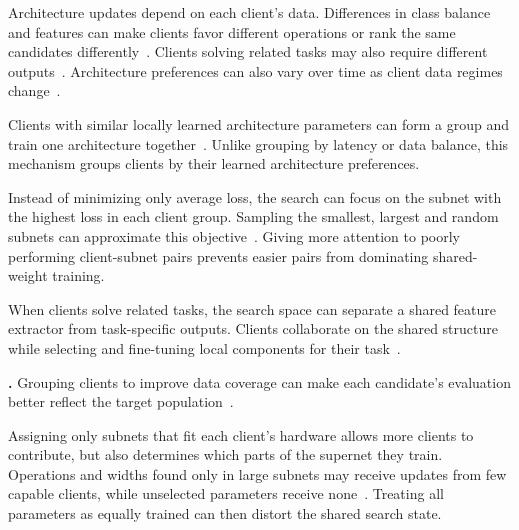 
Architecture updates depend on each client's data. Differences in class balance and features can make clients favor different operations or rank the same candidates differently~\cite{collaborative_nas_for_pfl_2025,superfednas_2024}. Clients solving related tasks may also require different outputs~\cite{fedpnas_2021}. Architecture preferences can also vary over time as client data regimes change~\cite{fedregnas_2025}.

 Clients with similar locally learned architecture parameters can form a group and train one architecture together~\cite{electricity_load_forecasting_fl_darts_2023}. Unlike grouping by latency or data balance, this mechanism groups clients by their learned architecture preferences.

 Instead of minimizing only average loss, the search can focus on the subnet with the highest loss in each client group. Sampling the smallest, largest and random subnets can approximate this objective~\cite{superfednas_2024}. Giving more attention to poorly performing client-subnet pairs prevents easier pairs from dominating shared-weight training.

 When clients solve related tasks, the search space can separate a shared feature extractor from task-specific outputs. Clients collaborate on the shared structure while selecting and fine-tuning local components for their task~\cite{fedpnas_2021}.

\noindent\textbf{.} Grouping clients to improve data coverage can make each candidate's evaluation better reflect the target population~\cite{finch_2024}.


Assigning only subnets that fit each client's hardware allows more clients to contribute, but also determines which parts of the supernet they train. Operations and widths found only in large subnets may receive updates from few capable clients, while unselected parameters receive none~\cite{fedoras_2022,peaches_2024,supernet_trade-off_fednas_2025}. Treating all parameters as equally trained can then distort the shared search state.

